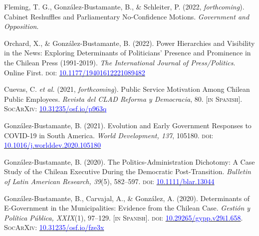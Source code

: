 \begin{publications}

\begin{benumerate}{8}

\item{Fleming, T. G., González-Bustamante, B., \& Schleiter, P. (2022, {\itshape forthcoming}). Cabinet Reshuffles and Parliamentary No-Confidence Motions. {\itshape Government and Opposition}.}\vspace{1mm}

\item{Orchard, X., \& González-Bustamante, B. (2022). Power Hierarchies and Visibility in the News: Exploring Determinants of Politicians’ Presence and Prominence in the Chilean Press (1991-2019). {\itshape The International Journal of Press/Politics}. Online First. {\scshape doi:} \href{https://doi.org/10.1177/19401612221089482}{\textcolor{blue}{10.1177/19401612221089482}}}\vspace{1mm}

\item{\small Cuevas, C. {\itshape et al.} (2021, {\itshape forthcoming}). Public Service Motivation Among Chilean Public Employees. {\itshape Revista del CLAD Reforma y Democracia}, 80. {\footnotesize \scshape [in Spanish]}. {\scshape \footnotesize SocArXiv}: \href{https://doi.org/10.31235/osf.io/p963q}{\textcolor{blue}{10.31235/osf.io/p963q}}}\vspace{1mm}

\item{\small Gonz\'alez-Bustamante, B. (2021). Evolution and Early Government Responses to COVID-19 in South America. {\itshape World Development, 137}, 105180. {\scshape doi:} \href{https://doi.org/10.1016/j.worlddev.2020.105180}{\textcolor{blue}{10.1016/j.worlddev.2020.105180}}}\vspace{1mm}

\item{\small Gonz\'alez-Bustamante, B. (2020). The Politics-Administration Dichotomy: A Case Study of the Chilean Executive During the Democratic Post-Transition. {\itshape Bulletin of Latin American Research, 39}(5), 582--597. {\scshape doi}: \href{https://doi.org/10.1111/blar.13044}{\textcolor{blue}{10.1111/blar.13044}}}\vspace{1mm}

\item{\small Gonz\'alez-Bustamante, B., Carvajal, A., \& Gonz\'alez, A. (2020). Determinants of E-Government in the Municipalities: Evidence from the Chilean Case. {\itshape Gesti\'on y Pol\'itica P\'ublica, XXIX}(1), 97--129. {\footnotesize \scshape [in Spanish]}. {\scshape doi:} \href{http://dx.doi.org/10.29265/gypp.v29i1.658}{\textcolor{blue}{10.29265/gypp.v29i1.658}}. {\scshape \footnotesize SocArXiv}: \href{https://doi.org/10.31235/osf.io/fze3x}{\textcolor{blue}{10.31235/osf.io/fze3x}}} \vspace{1mm}


\end{benumerate}
\end{publications}
